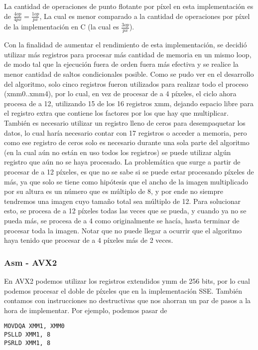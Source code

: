 La cantidad de operaciones de punto flotante por píxel en esta implementación es de $\frac{4op}{4px} = \frac{1op}{px}$, La cual es menor comparado a la cantidad de operaciones por píxel de la implementación en C (la cual es $\frac{3op}{px}$).

Con la finalidad de aumentar el rendimiento de esta implementación, se decidió utilizar más registros para procesar más cantidad de memoria en un mismo loop, de modo tal que la ejecución fuera de orden fuera más efectiva y se realice la menor cantidad de saltos condicionales posible. Como se pudo ver en el desarrollo del algoritmo, solo cinco registros fueron utilizados para realizar todo el proceso (xmm0..xmm4), por lo cual, en vez de procesar de a 4 píxeles, el ciclo ahora procesa de a 12, utilizando 15 de los 16 registros xmm, dejando espacio libre para el registro extra que contiene los factores por los que hay que multiplicar. También es necesario utilizar un registro lleno de ceros para desempaquetar los datos, lo cual haría necesario contar con 17 registros o acceder a memoria, pero como ese registro de ceros solo es necesario durante una sola parte del algoritmo (en la cual aún no están en uso todos los registros) se puede utilizar algún registro que aún no se haya procesado.
La problemática que surge a partir de procesar de a 12 píxeles, es que no se sabe si se puede estar procesando píxeles de más, ya que solo se tiene como hipótesis que el ancho de la imagen multiplicado por su altura es un número que es múltiplo de 8, y por ende no siempre tendremos una imagen cuyo tamaño total sea múltiplo de 12. Para solucionar esto, se procesa de a 12 píxeles todas las veces que se pueda, y cuando ya no se pueda más, se procesa de a 4 como originalmente se hacía, hasta terminar de procesar toda la imagen. Notar que no puede llegar a ocurrir que el algoritmo haya tenido que procesar de a 4 píxeles más de 2 veces.

\subsubsection{Asm - AVX2}

En AVX2 podemos utilizar los registros extendidos ymm de 256 bits, por lo cual podemos procesar el doble de píxeles que en la implementación SSE. También contamos con instrucciones no destructivas que nos ahorran un par de pasos a la hora de implementar. Por ejemplo, podemos pasar de

\begin{lstlisting}
MOVDQA XMM1, XMM0
PSLLD XMM1, 8
PSRLD XMM1, 8
\end{lstlisting}

